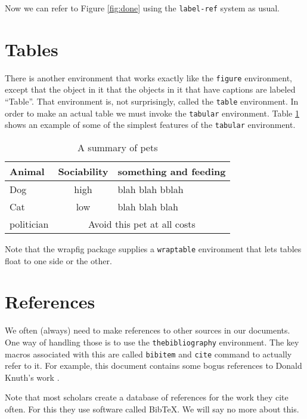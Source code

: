 \documentclass[12pt, leqno]{article}
\numberwithin{equation}{section}
\numberwithin{figure}{section}
\begin{document}
Now we can refer to Figure \ref{fig:done} using the \texttt{label-ref} system as usual. 

\section*{Tables}

There is another environment that works exactly like the \texttt{figure} environment, except that the object in it that the objects in it that have captions are labeled  ``Table''. That environment is, not surprisingly, called the \texttt{table} environment. In order to make an actual table we must invoke the \texttt{tabular} environment. 
Table \ref{tab:pets} shows an example of some of the simplest features of the \texttt{tabular} environment. 

\begin{table}[ht!] %
\caption{A summary of pets}
\label{tab:pets}
\begin{tabular}{| l | c | p{2in} |}
Animal & Sociability & something and feeding \\ 
\hline
Dog & high & blah blah bblah \\
\hline
Cat & low & blah blah blah \\ 
\cline{2-3}
politician & \multicolumn{2}{c|}{Avoid this pet at all costs} \\
\hline
\end{tabular}
\end{table}

Note that the wrapfig package supplies a \texttt{wraptable} environment that lets tables float to one side or the other. 

\section{References}

We often (always) need to make references to other sources in our documents. One way of handling those is to use 
the \texttt{thebibliography} environment. The key macros associated with this are called \texttt{bibitem} 
and \texttt{cite} command to actually refer to it. For example, this document contains some bogus references to Donald Knuth's work \cite{ref:knuth79}.

Note that most scholars create a database of references for the work they cite often. For this they use software called Bib\TeX. We will say no more about this.  
\end{document}
